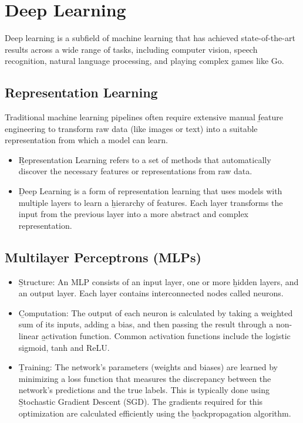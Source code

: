 \section{Deep Learning}
Deep learning is a subfield of machine learning that has achieved state-of-the-art results across a wide range of tasks, including computer vision, speech recognition, natural language processing, and playing complex games like Go.

\subsection{Representation Learning}
Traditional machine learning pipelines often require extensive manual \b{feature engineering} to transform raw data (like images or text) into a suitable representation from which a model can learn.
\begin{itemize}
    \item \b{Representation Learning} refers to a set of methods that automatically discover the necessary features or representations from raw data.
    \item \b{Deep Learning} is a form of representation learning that uses models with multiple layers to learn a \b{hierarchy of features}. Each layer transforms the input from the previous layer into a more abstract and complex representation.
\end{itemize}

\subsection{Multilayer Perceptrons (MLPs)}
\begin{itemize}
    \item \b{Structure:} An MLP consists of an input layer, one or more \b{hidden layers}, and an output layer. Each layer contains interconnected nodes called neurons.
    \item \b{Computation:} The output of each neuron is calculated by taking a weighted sum of its inputs, adding a bias, and then passing the result through a non-linear \b{activation function}. Common activation functions include the logistic sigmoid, tanh and ReLU.
    \item \b{Training:} The network's parameters (weights and biases) are learned by minimizing a loss function that measures the discrepancy between the network's predictions and the true labels. This is typically done using \b{Stochastic Gradient Descent (SGD)}. The gradients required for this optimization are calculated efficiently using the \b{backpropagation} algorithm.
\end{itemize}

